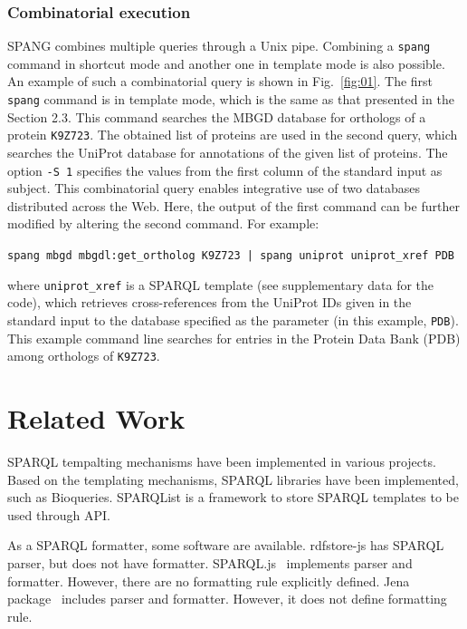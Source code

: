 \documentclass[runningheads]{llncs}
\begin{document}
\subsubsection{Combinatorial execution}

SPANG combines multiple queries through a Unix pipe. 
Combining a {\tt spang} command in shortcut mode and another one in template mode is also possible.
An example of such a combinatorial query is shown in Fig.~\ref{fig:01}.
The first {\tt spang} command is in template mode, which is the same as that presented in the Section 2.3. 
This command searches the MBGD database for orthologs of a protein {\tt K9Z723}. 
The obtained list of proteins are used in the second query, which searches the UniProt database for annotations of the given list of proteins. 
The option \texttt{-S 1} specifies the values from the first column of the standard input as subject.
This combinatorial query enables integrative use of two databases distributed across the Web. 
Here, the output of the first command can be further modified by altering the second command.
For example:
\begin{quoting}
\texttt{spang mbgd mbgdl:get\_ortholog K9Z723 | spang uniprot uniprot\_xref PDB}
\vspace{1pt}
\end{quoting}
where {\tt uniprot\_xref} is a SPARQL template (see supplementary data for the code), which retrieves cross-references from the UniProt IDs given in the standard input to the database specified as the parameter (in this example, {\tt PDB}). This example command line searches for entries in the Protein Data Bank (PDB) \citep{Berman} among orthologs of {\tt K9Z723}.



\section{Related Work}

SPARQL tempalting mechanisms have been implemented in various projects. Based on the templating mechanisms, SPARQL libraries have been implemented, such as Bioqueries. SPARQList is a framework to store SPARQL templates to be used through API.

As a SPARQL formatter, some software are available.
rdfstore-js\cite{rdfstore-js} has SPARQL parser, but does not have formatter.
SPARQL.js~\cite{sparql-js} implements parser and formatter. However, there are no formatting rule explicitly defined.
Jena package~\cite{jena} includes parser and formatter. However, it does not define formatting rule.
\end{document}
